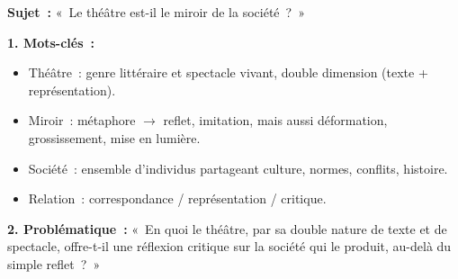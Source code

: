\documentclass[11pt]{article}
\newcommand{\cle}[1]{{\popxbold\color{popdark}#1}}
\begin{document}
\begin{exemplebox}
\textbf{Sujet~:} «~Le théâtre est-il le miroir de la société~?~»

\textbf{1. Mots-clés~:}
\begin{itemize}
    \item \cle{Théâtre}~: genre littéraire et spectacle vivant, double dimension (texte + représentation).
    \item \cle{Miroir}~: métaphore $\rightarrow$ reflet, imitation, mais aussi déformation, grossissement, mise en lumière.
    \item \cle{Société}~: ensemble d'individus partageant culture, normes, conflits, histoire.
    \item Relation~: correspondance / représentation / critique.
\end{itemize}

\textbf{2. Problématique~:} «~En quoi le théâtre, par sa double nature de texte et de spectacle, offre-t-il une réflexion critique sur la société qui le produit, au-delà du simple reflet~?~»


\end{exemplebox}
\end{document}
